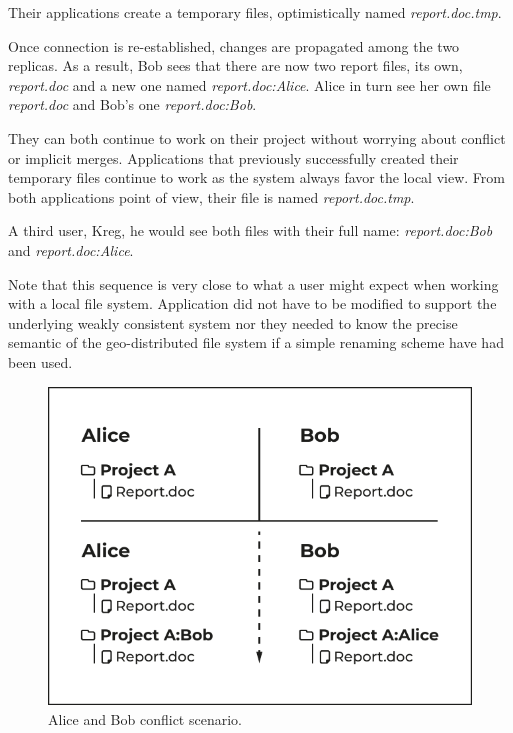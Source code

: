 \documentclass[sigconf, 10pt]{acmart}
\begin{document}
Their applications create a temporary files, optimistically named \textit{report.doc.tmp}.

Once connection is re-established, changes are propagated among the two replicas.
As a result, Bob sees that there are now two report files, its own, \textit{report.doc} and a new one named \textit{report.doc:Alice}.
Alice in turn see her own file \textit{report.doc} and Bob's one \textit{report.doc:Bob}.

They can both continue to work on their project without worrying about
conflict or implicit merges. Applications that previously successfully created their temporary files continue to work as the system always favor the local view. From both applications point of view, their file is named \textit{report.doc.tmp}.

A third user, Kreg, he would see both files with their full name: \textit{report.doc:Bob} and \textit{report.doc:Alice}.

Note that this sequence is very close to what a user might expect when working with a local file system. Application did not have to be modified to support the underlying weakly consistent system nor they needed to know the precise semantic of the geo-distributed file system if a simple renaming scheme have had been used.

\begin{figure}[h]
	\caption{Alice and Bob conflict scenario.}
	\centering
	\includegraphics[scale=0.5]{AliceBob-font-des-fichiers.pdf}
\end{figure}
\end{document}
